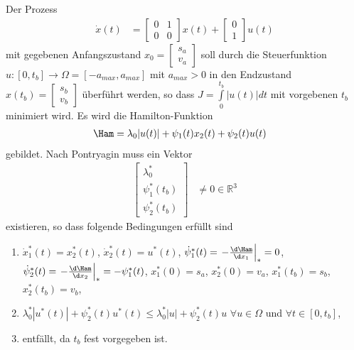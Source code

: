 \begin{exmp}
Der Prozess
\begin{align*}
	\dot{x}(t) & = \begin{bmatrix}
	0 & 1 \\ 0 & 0
	\end{bmatrix}x(t) + \begin{bmatrix}
	0\\ 1
	\end{bmatrix}u(t)
\end{align*}
mit gegebenen Anfangszustand $x_0=\begin{bmatrix}
s_a\\ v_a
\end{bmatrix}$ soll durch die Steuerfunktion $u:[0,t_b]\rightarrow\Omega=[-a_{max},a_{max}]$ mit $a_{max}>0$ in den Endzustand $x(t_b)=\begin{bmatrix}
s_b\\ v_b
\end{bmatrix}$ überführt werden, so dass $J=\int\limits_0^{t_b}|u(t)|dt$ mit vorgebenen $t_b$ minimiert wird. Es wird die Hamilton-Funktion
\begin{align*}
	\Ham & = \lambda_0|u(t)|+\psi_1(t)x_2(t)+\psi_2(t)u(t)
\end{align*}
gebildet. Nach Pontryagin muss ein Vektor 
\begin{align*}
	\begin{bmatrix}
	\lambda_0^{\ast}\\ \psi_1^{\ast}(t_b)\\ \psi_2^{\ast}(t_b)
	\end{bmatrix} & \neq 0 \in\mathbb{R}^3
\end{align*}
existieren, so dass folgende Bedingungen erfüllt sind
\begin{enumerate}[label=(\alph*)]
  \item $\dot{x}_1^{\ast}(t)=x_2^{\ast}(t)$, $\dot{x}_2^{\ast}(t)=u^{\ast}(t)$, $\dot{\psi}_1^{\ast}(t)=\left.-\frac{\d \Ham}{\d
  x_1}\right|_{\ast}=0$, $\dot{\psi}_2^{\ast}(t)=\left.-\frac{\d \Ham}{\d x_2}\right|_{\ast}=-\psi_1^{\ast}(t)$, $x_1^{\ast}(0)=s_a$,
  $x_2^{\ast}(0)=v_a$, $x_1^{\ast}(t_b)=s_b$, $x_2^{\ast}(t_b)=v_b$,
  \item $\lambda_0^{\ast}\left|u^{\ast}(t) \right|+\psi_2^{\ast}(t)u^{\ast}(t)\leq \lambda_0^{\ast}\left|u
  \right|+\psi_2^{\ast}(t)u $ $\forall u\in\Omega$ und $\forall t\in[0,t_b]$,
  \item entfällt, da $t_b$ fest vorgegeben ist.
\end{enumerate}

\end{exmp}
